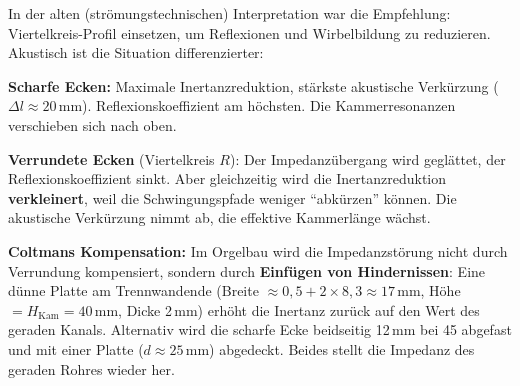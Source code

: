 \documentclass[11pt,a4paper]{article}
\begin{document}
In der alten (strömungstechnischen) Interpretation war die Empfehlung: Viertelkreis-Profil einsetzen, um Reflexionen und Wirbelbildung zu reduzieren. Akustisch ist die Situation differenzierter:

\textbf{Scharfe Ecken:} Maximale Inertanzreduktion, stärkste akustische Verkürzung ($\Delta l \approx 20$\,mm). Reflexionskoeffizient am höchsten. Die Kammerresonanzen verschieben sich nach oben.

\textbf{Verrundete Ecken} (Viertelkreis $R$): Der Impedanzübergang wird geglättet, der Reflexionskoeffizient sinkt. Aber gleichzeitig wird die Inertanzreduktion \textbf{verkleinert}, weil die Schwingungspfade weniger ``abkürzen'' können. Die akustische Verkürzung nimmt ab, die effektive Kammerlänge wächst.

\textbf{Coltmans Kompensation:} Im Orgelbau wird die Impedanzstörung nicht durch Verrundung kompensiert, sondern durch \textbf{Einfügen von Hindernissen}: Eine dünne Platte am Trennwandende (Breite $\approx 0{,}5 + 2 \times 8{,}3 \approx 17$\,mm, Höhe $= H_\text{Kam} = 40$\,mm, Dicke 2\,mm) erhöht die Inertanz zurück auf den Wert des geraden Kanals. Alternativ wird die scharfe Ecke beidseitig 12\,mm bei 45\textdegree{} abgefast und mit einer Platte ($d \approx 25$\,mm) abgedeckt. Beides stellt die Impedanz des geraden Rohres wieder her.

\begin{table}[H]
\centering\small
{}
\caption{Vergleich der Eckengeometrien -- akustische Wirkung}
\end{table}
\end{document}
